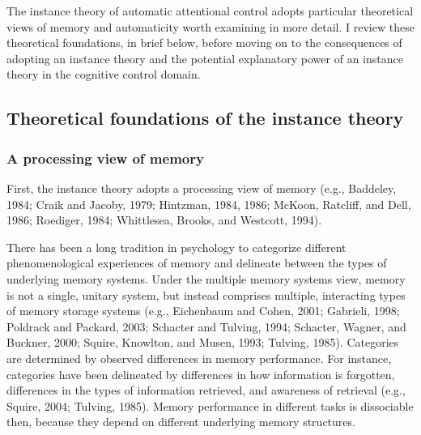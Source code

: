 \documentclass[]{DissertateCUNY}
\begin{document}
The instance theory of automatic attentional control adopts particular
theoretical views of memory and automaticity worth examining in more
detail. I review these theoretical foundations, in brief below, before
moving on to the consequences of adopting an instance theory and the
potential explanatory power of an instance theory in the cognitive
control domain.

\hypertarget{theoretical-foundations-of-the-instance-theory}{%
\subsection{Theoretical foundations of the instance
theory}\label{theoretical-foundations-of-the-instance-theory}}

\hypertarget{a-processing-view-of-memory}{%
\subsubsection{A processing view of
memory}\label{a-processing-view-of-memory}}

First, the instance theory adopts a processing view of memory (e.g.,
Baddeley, 1984; Craik and Jacoby, 1979; Hintzman, 1984, 1986; McKoon,
Ratcliff, and Dell, 1986; Roediger, 1984; Whittlesea, Brooks, and
Westcott, 1994).

There has been a long tradition in psychology to categorize different
phenomenological experiences of memory and delineate between the types
of underlying memory systems. Under the multiple memory systems view,
memory is not a single, unitary system, but instead comprises multiple,
interacting types of memory storage systems (e.g., Eichenbaum and Cohen,
2001; Gabrieli, 1998; Poldrack and Packard, 2003; Schacter and Tulving,
1994; Schacter, Wagner, and Buckner, 2000; Squire, Knowlton, and Musen,
1993; Tulving, 1985). Categories are determined by observed differences
in memory performance. For instance, categories have been delineated by
differences in how information is forgotten, differences in the types of
information retrieved, and awareness of retrieval (e.g., Squire, 2004;
Tulving, 1985). Memory performance in different tasks is dissociable
then, because they depend on different underlying memory structures.
\end{document}

